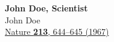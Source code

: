 \begin{publications}
  \item
    \label{A}
    {\bf John Doe, Scientist} \\
    \newblock John Doe\\
    \newblock \href{https://doi.org/10.1038/213644c0}{Nature \textbf{213}, 644–645 (1967)}
\end{publications}
